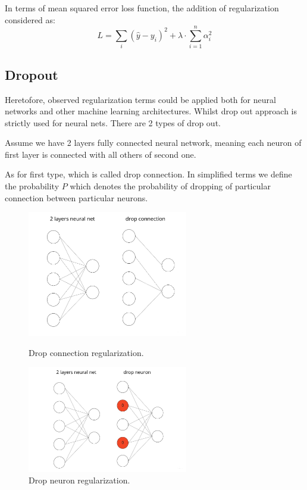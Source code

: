 In terms of mean squared error loss function, the addition of regularization considered as:
\[ L = \sum_{i}(\hat{y}-y_i)^2 + \lambda \cdot \sum_{i=1}^{n} \alpha_i^2\]

\subsection{Dropout}
Heretofore, observed regularization terms could be applied both for neural networks and other machine learning architectures. Whilst drop out approach is strictly used for neural nets. There are 2 types of drop out. 

Assume we have 2 layers fully connected neural network, meaning each neuron of first layer is connected with all others of second one. 

As for first type, which is called drop connection. In simplified terms we define the probability $P$ which denotes the probability of dropping of particular connection between particular neurons.  

\begin{figure}[H]
\centering
\begin{minipage}{.48\linewidth}
    \includegraphics[width=7cm]{images/drop_connection.jpg}
    \caption {Drop connection regularization.}
    \label{fig:drop_connection}
\end{minipage}
\hfill
\begin{minipage}{.48\linewidth}
    \includegraphics[width=7cm]{images/drop_neuron.jpg}
    \caption {Drop neuron regularization.}
    \label{fig:drop_neuron}
\end{minipage}
\end{figure}

